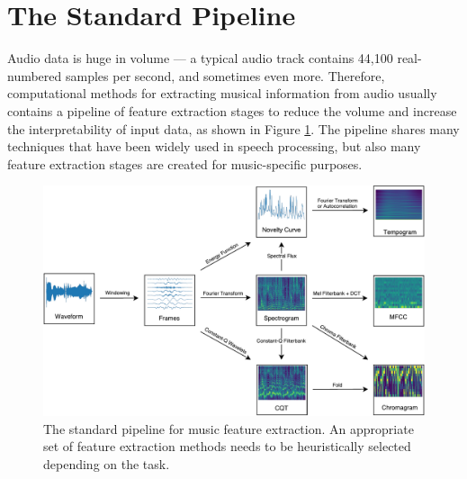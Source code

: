 \section{The Standard Pipeline}

Audio data is huge in volume --- a typical audio track contains 44,100 real-numbered samples per second, and sometimes even more.
Therefore, computational methods for extracting musical information from audio usually contains a pipeline of feature extraction stages to reduce the volume and increase the interpretability of input data, as shown in Figure \ref{fig:pipeline}.
The pipeline shares many techniques that have been widely used in speech processing, but also many feature extraction stages are created for music-specific purposes.

\begin{figure}[t]
	\includegraphics[width=\textwidth]{pipeline.pdf}
	\caption{\small The standard pipeline for music feature extraction. An appropriate set of feature extraction methods needs to be heuristically selected depending on the task.}\label{fig:pipeline}
\end{figure}

